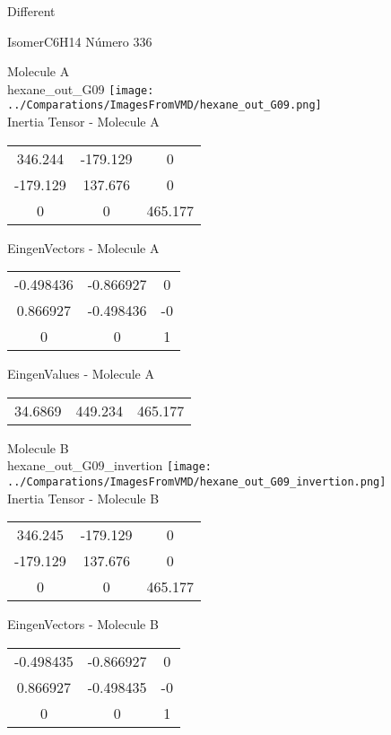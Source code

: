 \begin{center}
\vtab
\vtab
\textcolor{NavyBlue}{\Large Different}
\end{center}

 \newpage

\vtab[-2cm]
\begin{center}
{\large IsomerC6H14 \tab Número 336}
\end{center}
\begin{multicols}{2}
\begin{center}

Molecule A \\ 
hexane\_out\_G09
\texttt{[image: ../Comparations/ImagesFromVMD/hexane\_out\_G09.png]}
\\
Inertia Tensor - Molecule A \\
\vtab

\begin{tabular}{|c c c|}
346.244	 & 	-179.129	 & 	0	 \\
-179.129	 & 	137.676	 & 	0	 \\
0	 & 	0	 & 	465.177
\end{tabular}

\vtab
 EingenVectors - Molecule A     \\
\vtab
\begin{tabular}{|c c c|}
-0.498436	 & 	-0.866927	 & 	0	 \\
0.866927	 & 	-0.498436	 & 	-0	 \\
0	 & 	0	 & 	1
\end{tabular}

\vtab
 EingenValues - Molecule A     \\
\vtab
\begin{tabular}{|c c c|}
34.6869	 & 	449.234	 & 	465.177	 \\
\end{tabular}
\columnbreak

Molecule B \\ 
hexane\_out\_G09\_invertion
\texttt{[image: ../Comparations/ImagesFromVMD/hexane\_out\_G09\_invertion.png]}
\\
Inertia Tensor - Molecule B \\
\vtab

\begin{tabular}{|c c c|}
346.245	 & 	-179.129	 & 	0	 \\
-179.129	 & 	137.676	 & 	0	 \\
0	 & 	0	 & 	465.177
\end{tabular}

\vtab
 EingenVectors - Molecule B     \\
\vtab
\begin{tabular}{|c c c|}
-0.498435	 & 	-0.866927	 & 	0	 \\
0.866927	 & 	-0.498435	 & 	-0	 \\
0	 & 	0	 & 	1
\end{tabular}


\end{center}
\end{multicols}
